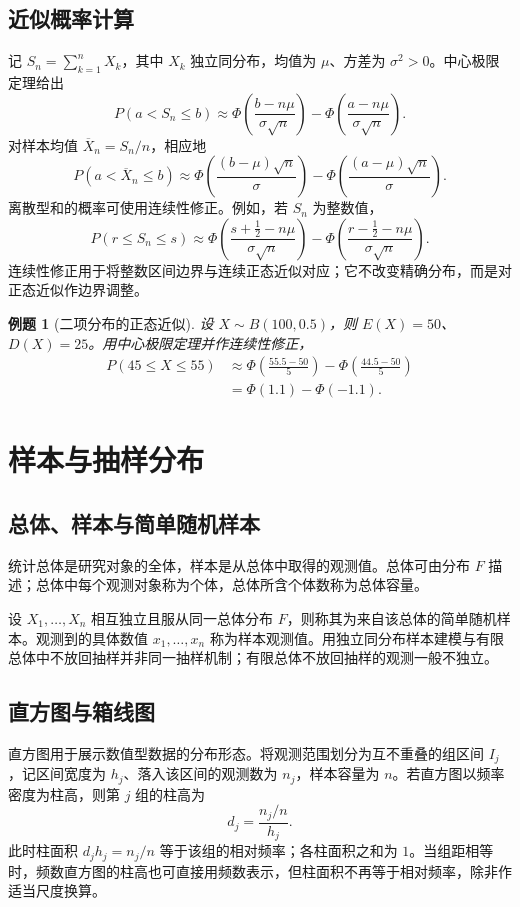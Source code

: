\documentclass[11pt,a4paper,fontset=fandol]{ctexart}
\newtheorem{example}{例题}[section]
\theoremstyle{remark}
\begin{document}
\subsection{近似概率计算}
记 $S_n=\sum_{k=1}^{n}X_k$，其中 $X_k$ 独立同分布，均值为 $\mu$、方差为 $\sigma^2>0$。中心极限定理给出
\[
    P(a<S_n\leq b)
    \approx
    \Phi\left(\frac{b-n\mu}{\sigma\sqrt n}\right)
    -\Phi\left(\frac{a-n\mu}{\sigma\sqrt n}\right).
\]
对样本均值 $\overline X_n=S_n/n$，相应地
\[
    P(a<\overline X_n\leq b)
    \approx
    \Phi\left(\frac{(b-\mu)\sqrt n}{\sigma}\right)
    -\Phi\left(\frac{(a-\mu)\sqrt n}{\sigma}\right).
\]
离散型和的概率可使用连续性修正。例如，若 $S_n$ 为整数值，
\[
    P(r\leq S_n\leq s)
    \approx
    \Phi\left(\frac{s+\frac12-n\mu}{\sigma\sqrt n}\right)
    -\Phi\left(\frac{r-\frac12-n\mu}{\sigma\sqrt n}\right).
\]
连续性修正用于将整数区间边界与连续正态近似对应；它不改变精确分布，而是对正态近似作边界调整。

\begin{example}[二项分布的正态近似]
设 $X\sim B(100,0.5)$，则 $E(X)=50$、$D(X)=25$。用中心极限定理并作连续性修正，
\[
\begin{aligned}
    P(45\leq X\leq55)
    &\approx
    \Phi\left(\frac{55.5-50}{5}\right)
    -\Phi\left(\frac{44.5-50}{5}\right)\\
    &=\Phi(1.1)-\Phi(-1.1).
\end{aligned}
\]
\end{example}

\clearpage
\section{样本与抽样分布}
\subsection{总体、样本与简单随机样本}
统计总体是研究对象的全体，样本是从总体中取得的观测值。总体可由分布 $F$ 描述；总体中每个观测对象称为个体，总体所含个体数称为总体容量。

设 $X_1,\ldots,X_n$ 相互独立且服从同一总体分布 $F$，则称其为来自该总体的简单随机样本。观测到的具体数值 $x_1,\ldots,x_n$ 称为样本观测值。用独立同分布样本建模与有限总体中不放回抽样并非同一抽样机制；有限总体不放回抽样的观测一般不独立。

\subsection{直方图与箱线图}
直方图用于展示数值型数据的分布形态。将观测范围划分为互不重叠的组区间 $I_j$，记区间宽度为 $h_j$、落入该区间的观测数为 $n_j$，样本容量为 $n$。若直方图以频率密度为柱高，则第 $j$ 组的柱高为
\[
    d_j=\frac{n_j/n}{h_j}.
\]
此时柱面积 $d_jh_j=n_j/n$ 等于该组的相对频率；各柱面积之和为 $1$。当组距相等时，频数直方图的柱高也可直接用频数表示，但柱面积不再等于相对频率，除非作适当尺度换算。
\end{document}
